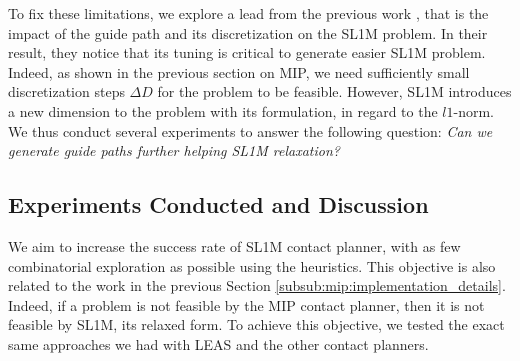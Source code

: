 To fix these limitations, we explore a lead from the previous work \cite{sl1m_v2}, that is the impact of the guide path and its discretization on the SL1M problem.
In their result, they notice that its tuning is critical to generate easier SL1M problem.
Indeed, as shown in the previous section on MIP, we need sufficiently small discretization steps $\Delta D$ for the problem to be feasible. 
However, SL1M introduces a new dimension to the problem with its formulation, in regard to the $l1$-norm.
We thus conduct several experiments to answer the following question: \textit{Can we generate guide paths further helping SL1M relaxation?}


\subsection{Experiments Conducted and Discussion}

We aim to increase the success rate of SL1M contact planner, with as few combinatorial exploration as possible using the heuristics.
This objective is also related to the work in the previous Section \ref{subsub:mip:implementation_details}. 
Indeed, if a problem is not feasible by the MIP contact planner, then it is not feasible by SL1M, its relaxed form.
To achieve this objective, we tested the exact same approaches we had with LEAS and the other contact planners.

